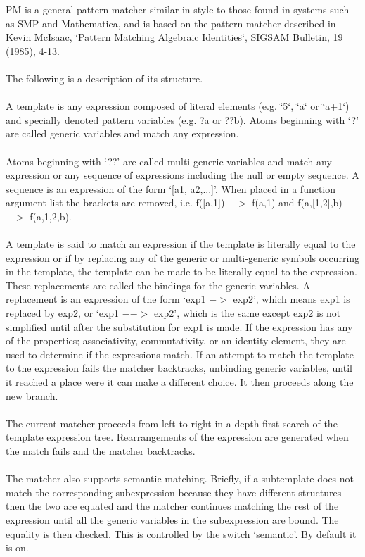 
PM is a general pattern matcher similar in style to those found in systems
such as SMP and Mathematica, and is based on the pattern matcher described
in Kevin McIsaac, \char`\"{}Pattern Matching Algebraic Identities\char`\"{},
SIGSAM Bulletin, 19 (1985), 4-13. \\
\ \\
The following is a description of its structure. \\
\ \\
A template is any expression composed of literal elements (e.g. \char`\"{}5\char`\"{},
\char`\"{}a\char`\"{} or \char`\"{}a+1\char`\"{}) and specially denoted pattern 
variables (e.g. ?a or ??b). Atoms beginning with `?' are called generic variables 
and match any expression. \\
\ \\
Atoms beginning with `??' are called multi-generic variables and match any
expression or any sequence of expressions including the null or empty
sequence. A sequence is an expression of the form `{[}a1, a2,...{]}'. When
placed in a function argument list the brackets are removed, i.e. f({[}a,1{]})
$->$ f(a,1) and f(a,{[}1,2{]},b) $->$ f(a,1,2,b). \\
\ \\
A template is said to match an expression if the template is literally
equal to the expression or if by replacing any of the generic or
multi-generic symbols occurring in the template, the template can be made
to be literally equal to the expression. These replacements are called the
bindings for the generic variables. A replacement is an expression of the
form `exp1 $->$ exp2', which means exp1 is replaced by exp2, or `exp1 $-->$
exp2', which is the same except exp2 is not simplified until after the
substitution for exp1 is made. If the expression has any of the
properties; associativity, commutativity, or an identity element, they are
used to determine if the expressions match. If an attempt to match the
template to the expression fails the matcher backtracks, unbinding generic
variables, until it reached a place were it can make a different choice.
It then proceeds along the new branch. \\
\ \\
The current matcher proceeds from left to right in a depth first search of
the template expression tree. Rearrangements of the expression are
generated when the match fails and the matcher backtracks. \\
\ \\
The matcher also supports semantic matching. Briefly, if a subtemplate
does not match the corresponding subexpression because they have different
structures then the two are equated and the matcher continues matching the
rest of the expression until all the generic variables in the subexpression
are bound. The equality is then checked. This is controlled by the switch
`semantic'. By default it is on. \\

